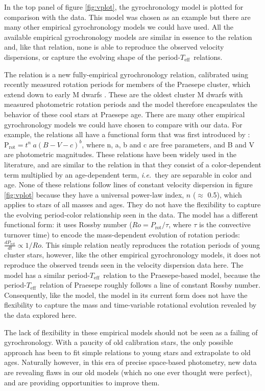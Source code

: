\documentclass{aastex63}
\newcommand{\ie}{{\it i.e.}}
\newcommand{\teff}{$T_{\mathrm{eff}}$}
\newcommand{\racomment}[1]{{\color{blue}#1}}
\begin{document}
\racomment{
In the top panel of figure \ref{fig:vplot}, the \citet{angus2019}
gyrochronology model is plotted for comparison with the data.
This model was chosen as an example but there are many other empirical
gyrochronology models we could have used.
All the available empirical gyrochronology models are similar in essence to
the \citet{angus2019} relation and, like that relation, none is able to
reproduce the observed velocity dispersions, or capture the evolving shape of
the period-\teff\ relations.

The \citet{angus2019} relation is a new fully-empirical gyrochronology
relation, calibrated using recently measured rotation periods for members of
the Praesepe cluster, which extend down to early M dwarfs \citep{rebull2017,
douglas2017}.
These are the oldest cluster M dwarfs with measured photometric rotation
periods and the \citet{angus2019} model therefore encapsulates the behavior of
these cool stars at Praesepe age.
There are many other empirical gyrochronology models we could have chosen to
compare with our data.
For example, the \citet{barnes2003, barnes2007, mamajek2008, meibom2011,
angus2015} relations all have a functional form that was first introduced by
\citet{barnes2003}: $\mathrm{P_{rot}} = t^n~a(B-V - c)^b$, where n, a, b and c
are free parameters, and B and V are photometric magnitudes.
These relations have been widely used in the literature, and are similar to
the \citet{angus2019} relation in that they consist of a color-dependent term
multiplied by an age-dependent term, \ie\ they are separable in color and age.
None of these relations follow lines of constant velocity dispersion in figure
\ref{fig:vplot} because they have a universal power-law index, $n$ ($\approx$
0.5), which applies to stars of all masses and ages.
They do not have the flexibility to capture the evolving period-color
relationship seen in the data.
The \citet{barnes2010} model has a different functional form: it uses Rossby
number ($Ro = P_\mathrm{rot}/\tau$, where $\tau$ is the convective turnover
time) to encode the mass-dependent evolution of rotation periods:
$\frac{dP_\mathrm{rot}}{dt} \propto 1/Ro$.
This simple relation neatly reproduces the rotation periods of young cluster
stars, however, like the other empirical gyrochronology models, it does not
reproduce the observed trends seen in the velocity dispersion data here.
The \citet{barnes2010} model has a similar period-\teff\ relation to the
Praesepe-based \citet{angus2019} model, because the period-\teff\ relation of
Praesepe roughly follows a line of constant Rossby number.
Consequently, like the \citet{angus2019} model, the \citet{barnes2010} model
in its current form does not have the flexibility to capture the mass and
time-variable rotational evolution revealed by the data explored here.

The lack of flexibility in these empirical models should not be seen as a
failing of gyrochronology.
With a paucity of old calibration stars, the only possible approach has been
to fit simple relations to young stars and extrapolate to old ages.
Naturally however, in this era of precise space-based photometry, new data are
revealing flaws in our old models (which no one ever thought were perfect),
and are providing opportunities to improve them.
}
\end{document}
